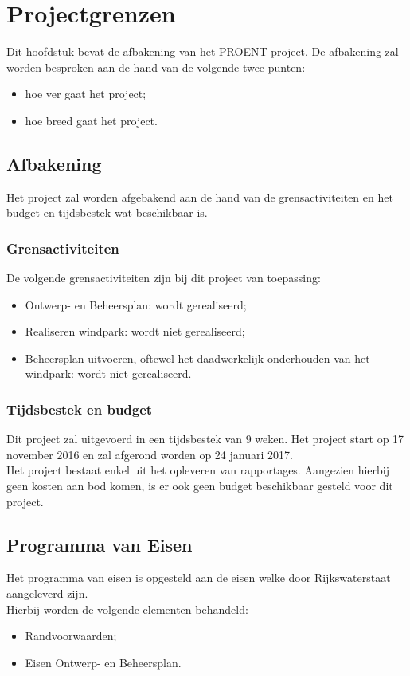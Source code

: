 \documentclass[numbers=endperiod]{scrartcl}
\newcommand{\sectionSmall}[1]{
	\vspace{-10pt}
	\section{#1}
	\vspace{-5pt}
}
\newcommand{\whitespace}{\vspace*{2 mm} \\}%
\begin{document}
	\sectionSmall{Projectgrenzen}
	Dit hoofdstuk bevat de afbakening van het PROENT project. De afbakening zal worden besproken aan de hand van de volgende twee punten:
	\begin{itemize}[noitemsep]
		\item hoe ver gaat het project;
		\item hoe breed gaat het project.
	\end{itemize}
	\subsection{Afbakening}
	Het project zal worden afgebakend aan de hand van de grensactiviteiten en het budget en tijdsbestek wat beschikbaar is.
	\subsubsection{Grensactiviteiten}
	De volgende grensactiviteiten zijn bij dit project van toepassing:
	\begin{itemize}
		\item Ontwerp- en Beheersplan: wordt gerealiseerd;
		\item Realiseren windpark: wordt niet gerealiseerd;
		\item Beheersplan uitvoeren, oftewel het daadwerkelijk onderhouden van het windpark: wordt niet gerealiseerd.
	\end{itemize}
	\subsubsection{Tijdsbestek en budget}
	Dit project zal uitgevoerd in een tijdsbestek van 9 weken. Het project start op 17 november 2016 en zal afgerond worden op 24 januari 2017.
	\whitespace
	Het project bestaat enkel uit het opleveren van rapportages. Aangezien hierbij geen kosten aan bod komen, is er ook geen budget beschikbaar gesteld voor dit project.
	\subsection{Programma van Eisen}
	Het programma van eisen is opgesteld aan de eisen welke door Rijkswaterstaat aangeleverd zijn.
	\whitespace
	Hierbij worden de volgende elementen behandeld:
	\begin{itemize}[noitemsep]
		\item Randvoorwaarden;
		\item Eisen Ontwerp- en Beheersplan.
	\end{itemize}
\end{document}
